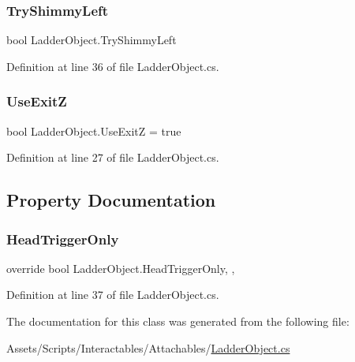 \subsubsection{\texorpdfstring{Try\+Shimmy\+Left}{TryShimmyLeft}}
{\footnotesize\ttfamily bool Ladder\+Object.\+Try\+Shimmy\+Left}



Definition at line 36 of file Ladder\+Object.\+cs.

\mbox{\label{class_ladder_object_ab54cdfaf922b790774eb7f689aac83df}} 
\subsubsection{\texorpdfstring{Use\+ExitZ}{UseExitZ}}
{\footnotesize\ttfamily bool Ladder\+Object.\+Use\+ExitZ = true}



Definition at line 27 of file Ladder\+Object.\+cs.



\subsection{Property Documentation}
\mbox{\label{class_ladder_object_a5034b325b06adadbf863c453ad06f1bd}} 
\subsubsection{\texorpdfstring{Head\+Trigger\+Only}{HeadTriggerOnly}}
{\footnotesize\ttfamily override bool Ladder\+Object.\+Head\+Trigger\+Only\hspace{0.3cm}{\ttfamily [get]}, {\ttfamily [set]}, {\ttfamily [protected]}}



Definition at line 37 of file Ladder\+Object.\+cs.



The documentation for this class was generated from the following file\+:\begin{DoxyCompactItemize}
\item 
Assets/\+Scripts/\+Interactables/\+Attachables/\mbox{\hyperlink{_ladder_object_8cs}{Ladder\+Object.\+cs}}\end{DoxyCompactItemize}

